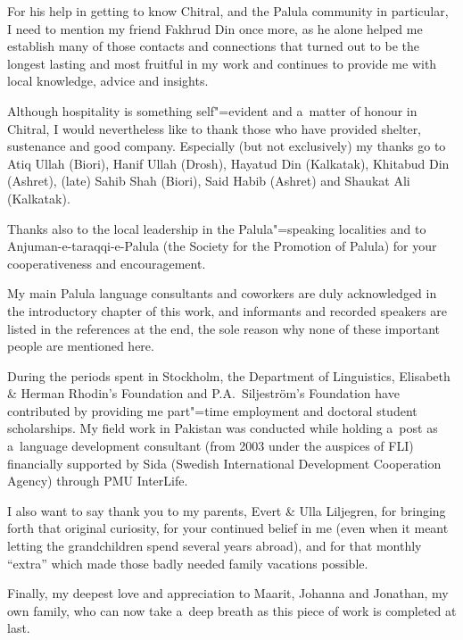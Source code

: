 \begin{refsection}
For his help in getting to know Chitral, and the Palula community in particular, I need to mention
my friend Fakhrud Din once more, as he alone helped me establish many of those contacts and
connections that turned out to be the longest lasting and most fruitful in my work and continues to
provide me with local knowledge, advice and insights.


Although hospitality is something self"=evident and a~matter of honour in Chitral, I would
nevertheless like to thank those who have provided shelter, sustenance and good company. Especially
(but not exclusively) my thanks go to Atiq Ullah (Biori), Hanif Ullah (Drosh), Hayatud Din
(Kalkatak), Khitabud Din (Ashret), (late) Sahib Shah (Biori), Said Habib (Ashret) and Shaukat Ali
(Kalkatak).


Thanks also to the local leadership in the Palula"=speaking localities and to
Anjuman-e-taraqqi-e-Palula (the Society for the Promotion of Palula) for your cooperativeness and
encouragement.


My main Palula language consultants and coworkers are duly acknowledged in the introductory chapter
of this work, and informants and recorded speakers are listed in the references at the end, the sole
reason why none of these important people are mentioned here.


During the periods spent in Stockholm, the Department of Linguistics, Elisabeth \& Herman Rhodin's
Foundation and P.A.~Siljeström's Foundation have contributed by providing me part"=time employment
and doctoral student scholarships. My field work in Pakistan was conducted while holding a~post as
a~language development consultant (from 2003 under the auspices of FLI) financially supported by
Sida (Swedish International Development Cooperation Agency) through PMU InterLife.


I also want to say thank you to my parents, Evert \& Ulla Liljegren, for bringing forth that
original curiosity, for your continued belief in me (even when it meant letting the grandchildren
spend several years abroad), and for that monthly ``extra'' which made those badly needed family
vacations possible.


Finally, my deepest love and appreciation to Maarit, Johanna and Jonathan, my own family, who can
now take a~deep breath as this piece of work is completed at last.

\printbibliography[heading=subbibliography]
\end{refsection}